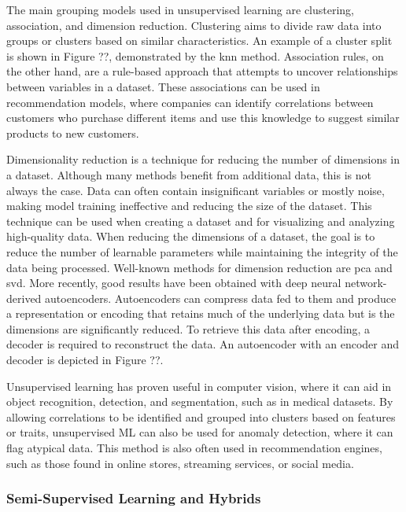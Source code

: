         The main grouping models used in unsupervised learning are clustering, association, and dimension reduction. Clustering aims to divide raw data into groups or clusters based on similar characteristics. An example of a cluster split is shown in Figure ??, demonstrated by the \gls{knn} method. Association rules, on the other hand, are a rule-based approach that attempts to uncover relationships between variables in a dataset. These associations can be used in recommendation models, where companies can identify correlations between customers who purchase different items and use this knowledge to suggest similar products to new customers.
        
        Dimensionality reduction is a technique for reducing the number of dimensions in a dataset. 
        Although many methods benefit from additional data, this is not always the case. Data can often contain insignificant variables or mostly noise, making model training ineffective and reducing the size of the dataset. This technique can be used when creating a dataset and for visualizing and analyzing high-quality data. When reducing the dimensions of a dataset, the goal is to reduce the number of learnable parameters while maintaining the integrity of the data being processed. Well-known methods for dimension reduction are \gls{pca} and \gls{svd}. More recently, good results have been obtained with deep neural network-derived autoencoders. Autoencoders can compress data fed to them and produce a representation or encoding that retains much of the underlying data but is the dimensions are significantly reduced.
        To retrieve this data after encoding, a decoder is required to reconstruct the data. An autoencoder with an encoder and decoder is depicted in Figure ??.
        
        Unsupervised learning has proven useful in computer vision, where it can aid in object recognition, detection, and segmentation, such as in medical datasets. By allowing correlations to be identified and grouped into clusters based on features or traits, unsupervised ML can also be used for anomaly detection, where it can flag atypical data. This method is also often used in recommendation engines, such as those found in online stores, streaming services, or social media.


        \subsubsection{Semi-Supervised Learning and Hybrids}

